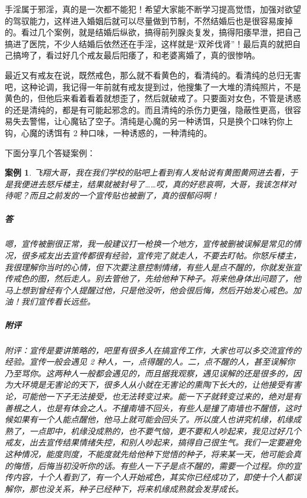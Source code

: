\documentclass[fontset=founder]{ctexart}
\newtheorem{case}{案例}
\begin{document}
手淫属于邪淫，真的是一次都不能犯！希望大家能不断学习提高觉悟，加强对欲望的驾驭能力，这样进入婚姻后就可以尽量做到节制，不然结婚后也是很容易废掉的。看过几个案例，就是结婚后纵欲，搞得前列腺炎复发，搞得阳痿早泄，把自己搞进了医院，不少人结婚后依然还在手淫，这样就是“双斧伐肾”！最后真的就把自己搞垮了，看过好几个戒友最后阳痿了，和老婆离婚了，真的很惨呐。

最近又有戒友在说，既然戒色，那么就不看黄色的，看清纯的。看清纯的总归无害吧，这种论调，我记得一年前就有戒友提到过，他搜集了一大堆的清纯照片，不是黄色的，但他后来看着看着就想歪了，然后就破戒了。只要面对女色，不管是诱惑的还是清纯的，都是有可能起邪念的。而且清纯的杀伤力更强，隐蔽性更高，很容易失去警惕，让心魔钻了空子。清纯是心魔的另一种诱饵，只是换个口味钓你上钩，心魔的诱饵有 2 种口味，一种诱惑的，一种清纯的。

下面分享几个答疑案例：

\begin{case}
    飞翔大哥，我在我们学校的贴吧上看到有人发帖说有黄图黄网进去看，于是我便进去怒斥楼主，结果就被封号了……哎，真的好悲哀啊，大哥，我该怎样对待呢？而且之前发的一个宣传贴也被删了，真的很郁闷啊！
    \subparagraph{答} 嗯，宣传被删很正常，我一般建议打一枪换一个地方，宣传被删被误解是常见的情况，很多戒友出去宣传都很有经验，宣传完了就走人，不要去盯帖。你怒斥楼主，我很理解你当时的心情，但下次要注意控制情绪，有些人是点不醒的，你就发张宣传戒色的图，然后走人。别去管他了，先给他种下种子。将来他身体出问题了，他马上想到曾经有个人提醒过他，只是他没听，他会很后悔，然后开始发心戒色。加油！我们宣传看长远些。
    \subparagraph{附评} 附评：宣传是要讲策略的，吧里有很多人在搞宣传工作，大家也可以多交流宣传的经验。宣传一般会遇见 2 种人，一，点得醒的人。二，点不醒的人，甚至误解你乃至骂你。这两种人一般都会遇见的，而且据我观察，遇见误解的还是很多的，因为大环境是无害论的天下，很多人从小就在无害论的熏陶下长大的，让他接受有害论，可能他一下子无法接受，也无法转变过来。能一下子就转变过来的，绝对是有善根之人，也是有体会之人。不撞南墙不回头，有些人是撞了南墙也不醒悟，这时候如果有一个人能点醒他，他马上就可能会回头了。所以度人也讲究机缘，机缘成熟了，一点即中，机缘没成熟的，也不要气恼，更不要和人吵起来，我见过好几个戒友，出去宣传结果情绪失控，和别人吵起来，搞得自己很生气。我们一定要避免这种情况，能度则度，不能度就先给他种下觉悟的种子，将来某一天，他可能会真的悔悟，后悔当初没听你的话。有些人一下子是点不醒的，需要一个过程。你的宣传内容，十个人看到了，有一个人开始戒色，其实你已经成功了，即使十个人都误解你，那也没关系，种子已经种下，将来机缘成熟就会发芽成长。
\end{case}
\end{document}

